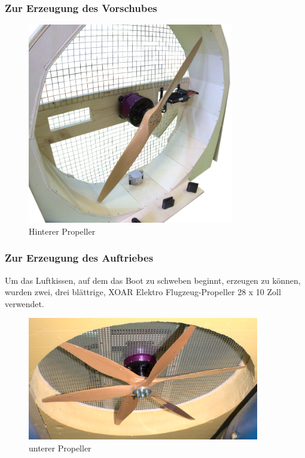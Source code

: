 \subsubsection{Zur Erzeugung des Vorschubes}

\begin{figure}[h]
    \centering
    \includegraphics[width=0.8\textwidth]{Fotos/Propeller_Hinten.png}
    \caption{Hinterer Propeller}
\end{figure}

\newpage
\subsubsection{Zur Erzeugung des Auftriebes}
Um das Luftkissen, auf dem das Boot zu schweben beginnt, erzeugen zu können, wurden zwei, drei blättrige, XOAR Elektro Flugzeug-Propeller 28 x 10 Zoll verwendet.  
\begin{figure}[h]
    \centering
    \includegraphics[width=0.9\textwidth]{Fotos/Propeller_unten.png}
    \caption{unterer Propeller}
\end{figure}


